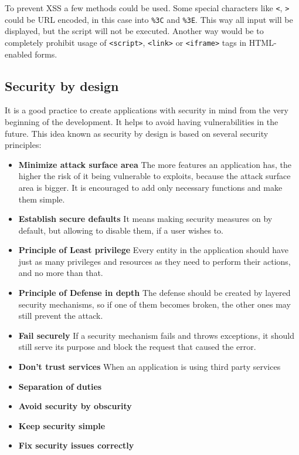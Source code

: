 \documentclass[a4paper]{article}
\begin{document}
To prevent XSS a few methods could be used. Some special characters like
\texttt{<}, \texttt{>} could be URL encoded, in this case into \texttt{\%3C} and
\texttt{\%3E}. This way all input will be displayed, but the script will not be
executed. Another way would be to completely prohibit usage of
\texttt{<script>}, \texttt{<link>} or \texttt{<iframe>} tags in HTML-enabled
forms.

\subsection{Security by design}

It is a good practice to create applications with security in mind from the very
beginning of the development. It helps to avoid having vulnerabilities in the
future. This idea known as security by design is based on several security
principles:

\begin{itemize}
	\item \textbf{Minimize attack surface area}
		The more features an application has, the higher the risk of it
		being vulnerable to exploits, because the attack surface area is
		bigger. It is encouraged to add only necessary functions and
		make them simple.
	\item \textbf{Establish secure defaults}
		It means making security measures on by default, but allowing to
		disable them, if a user wishes to.
	\item \textbf{Principle of Least privilege}
		Every entity in the application should have just as many
		privileges and resources as they need to perform their actions,
		and no more than that.
	\item \textbf{Principle of Defense in depth}
		The defense should be created by layered security mechanisms, so
		if one of them becomes broken, the other ones may still prevent
		the attack.
	\item \textbf{Fail securely}
		If a security mechanism fails and throws exceptions, it should
		still serve its purpose and block the request that caused the
		error.
	\item \textbf{Don't trust services}
		When an application is using third party services
	\item \textbf{Separation of duties}
	\item \textbf{Avoid security by obscurity}
	\item \textbf{Keep security simple}
	\item \textbf{Fix security issues correctly}
\end{itemize}
\end{document}
